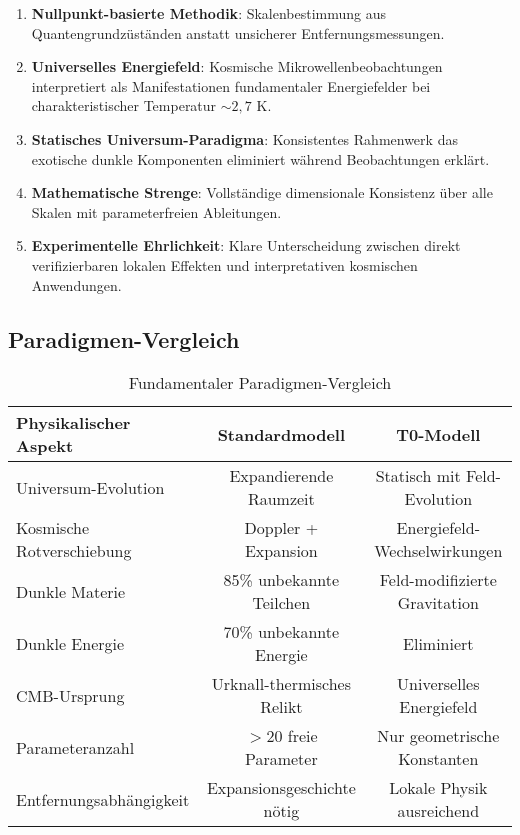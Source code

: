 \documentclass[12pt,a4paper]{article}
\begin{document}
	\begin{enumerate}
		\item \textbf{Nullpunkt-basierte Methodik}: Skalenbestimmung aus Quantengrundz\"ust\"anden anstatt unsicherer Entfernungsmessungen.
		
		\item \textbf{Universelles Energiefeld}: Kosmische Mikrowellenbeobachtungen interpretiert als Manifestationen fundamentaler Energiefelder bei charakteristischer Temperatur $\sim 2{,}7$ K.
		
		\item \textbf{Statisches Universum-Paradigma}: Konsistentes Rahmenwerk das exotische dunkle Komponenten eliminiert w\"ahrend Beobachtungen erkl\"art.
		
		\item \textbf{Mathematische Strenge}: Vollst\"andige dimensionale Konsistenz \"uber alle Skalen mit parameterfreien Ableitungen.
		
		\item \textbf{Experimentelle Ehrlichkeit}: Klare Unterscheidung zwischen direkt verifizierbaren lokalen Effekten und interpretativen kosmischen Anwendungen.
	\end{enumerate}
	
	\subsection{Paradigmen-Vergleich}
	\label{subsec:paradigm_comparison}
	
	\begin{table}[htbp]
		\centering
		\begin{tabular}{|l|c|c|}
			\hline
			\textbf{Physikalischer Aspekt} & \textbf{Standardmodell} & \textbf{T0-Modell} \\
			\hline
			Universum-Evolution & Expandierende Raumzeit & Statisch mit Feld-Evolution \\
			Kosmische Rotverschiebung & Doppler + Expansion & Energiefeld-Wechselwirkungen \\
			Dunkle Materie & 85\% unbekannte Teilchen & Feld-modifizierte Gravitation \\
			Dunkle Energie & 70\% unbekannte Energie & Eliminiert \\
			CMB-Ursprung & Urknall-thermisches Relikt & Universelles Energiefeld \\
			Parameteranzahl & $>20$ freie Parameter & Nur geometrische Konstanten \\
			Entfernungsabh\"angigkeit & Expansionsgeschichte n\"otig & Lokale Physik ausreichend \\
			\hline
		\end{tabular}
		\caption{Fundamentaler Paradigmen-Vergleich}
		\label{tab:paradigm_final}
	\end{table}
	
\end{document}
